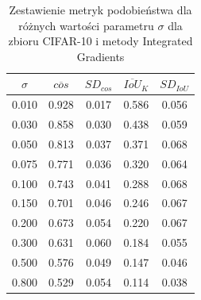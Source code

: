 \begin{table}[H] \centering \caption{Zestawienie metryk podobieństwa dla różnych wartości parametru \(\sigma\) dla zbioru CIFAR-10 i metody Integrated Gradients} \label{tab:ig_sg_cos_topk_cifar10} \begin{tabular}{ccccc} \toprule $\sigma$ & $\overline{cos}$ & $SD_{cos}$ & $\overline{IoU}_{K}$ & $SD_{IoU}$ \\ \midrule 0.010 & 0.928 & 0.017 & 0.586 & 0.056 \\ 0.030 & 0.858 & 0.030 & 0.438 & 0.059 \\ 0.050 & 0.813 & 0.037 & 0.371 & 0.068 \\ 0.075 & 0.771 & 0.036 & 0.320 & 0.064 \\ 0.100 & 0.743 & 0.041 & 0.288 & 0.068 \\ 0.150 & 0.701 & 0.046 & 0.246 & 0.067 \\ 0.200 & 0.673 & 0.054 & 0.220 & 0.067 \\ 0.300 & 0.631 & 0.060 & 0.184 & 0.055 \\ 0.500 & 0.576 & 0.049 & 0.147 & 0.046 \\ 0.800 & 0.529 & 0.054 & 0.114 & 0.038 \\ \bottomrule \end{tabular} \end{table}

